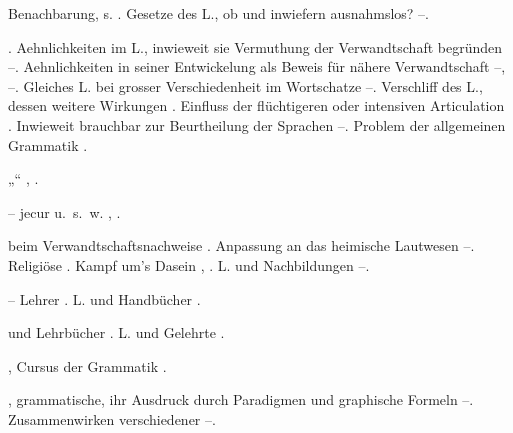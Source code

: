 \begin{register}





  Benachbarung, s. . Gesetze des L., ob und inwiefern ausnahmslos? \pageref{sp.185}–\pageref{sp.196}.

. Aehnlichkeiten im L., inwieweit sie Vermuthung der Verwandtschaft begründen \pageref{sp.148}–\pageref{sp.149}. Aehnlichkeiten in seiner Entwickelung als Beweis für nähere Verwandtschaft \pageref{sp.159}–\pageref{sp.160}, \pageref{sp.164}–\pageref{sp.165}. Gleiches L. bei grosser Verschiedenheit im Wortschatze \pageref{sp.165}–\pageref{sp.166}. Verschliff des L., dessen weitere Wirkungen \pageref{sp.178}. Einfluss der flüchtigeren oder intensiven Articulation \pageref{sp.183}. Inwieweit brauchbar zur Beurtheilung der Sprachen \pageref{sp.431}–\pageref{sp.432}. Problem der allgemeinen Grammatik \pageref{sp.479}.


„“ \pageref{sp.98}, \pageref{sp.105}.

 – jecur u.~s.~w. \pageref{sp.192}, \pageref{sp.217}.

 beim Verwandtschaftsnachweise \pageref{sp.154}. Anpassung an das heimische Lautwesen \pageref{sp.186}–\pageref{sp.187}.  Religiöse \pageref{sp.231}. Kampf um’s Dasein \pageref{sp.238}, \pageref{sp.262}. L. und Nachbildungen \pageref{sp.261}–\pageref{sp.268}.

 – Lehrer \pageref{sp.71}. L. und Handbücher \pageref{sp.111}.

 und Lehrbücher \pageref{sp.71}. L. und Gelehrte \pageref{sp.110}.

, Cursus der Grammatik \pageref{sp.111}.

, grammatische, ihr Ausdruck durch Paradigmen und graphische Formeln \pageref{sp.116}–\pageref{sp.119}. Zusammenwirken verschiedener \pageref{sp.118}–\pageref{sp.119}.


\end{register}
